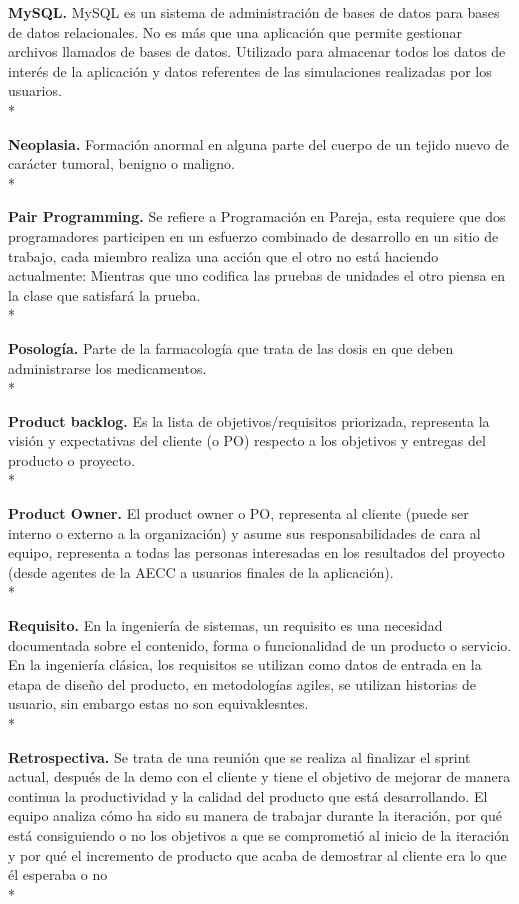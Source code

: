 \documentclass[../pfc.tex]{subfiles}
\begin{document}
	\textbf{MySQL.}
	MySQL es un sistema de administración de bases de datos para bases de datos relacionales. No es más que una aplicación que permite gestionar archivos llamados de bases de datos. Utilizado para almacenar todos los datos de interés de la aplicación y datos referentes de las simulaciones realizadas por los usuarios.\\*
	
	\textbf{Neoplasia.}
	Formación anormal en alguna parte del cuerpo de un tejido nuevo de carácter tumoral, benigno o maligno.\\*
	
	\textbf{Pair Programming.}
	Se refiere a Programación en Pareja, esta requiere que dos programadores participen en un esfuerzo combinado de desarrollo en un sitio de trabajo, cada miembro realiza una acción que el otro no está haciendo actualmente: Mientras que uno codifica las pruebas de unidades el otro piensa en la clase que satisfará la prueba.\\*
	
	\textbf{Posología.}
	Parte de la farmacología que trata de las dosis en que deben administrarse los medicamentos.\\*
	
	\textbf{Product backlog.}
	Es la lista de objetivos/requisitos priorizada, representa la visión y expectativas del cliente (o PO) respecto a los objetivos y entregas del producto o proyecto. \\*
	
	\textbf{Product Owner.}
	El product owner o PO, representa al cliente (puede ser interno o externo a la organización) y asume sus responsabilidades de cara al equipo, representa a todas las personas interesadas en los resultados del proyecto (desde agentes de la AECC a usuarios finales de la aplicación).\\*

	\textbf{Requisito.}
	En la ingeniería de sistemas, un requisito es una necesidad documentada sobre el contenido, forma o funcionalidad de un producto o servicio. En la ingeniería clásica, los requisitos se utilizan como datos de entrada en la etapa de diseño del producto, en metodologías agiles, se utilizan historias de usuario, sin embargo estas no son equivaklesntes.\\*
	
	\textbf{Retrospectiva.}
	Se trata de una reunión que se realiza al finalizar el sprint actual, después de la demo con el cliente y tiene el objetivo de mejorar de manera continua la productividad y la calidad del producto que está desarrollando.
	El equipo analiza cómo ha sido su manera de trabajar durante la iteración, por qué está consiguiendo o no los objetivos a que se comprometió al inicio de la iteración y por qué el incremento de producto que acaba de demostrar al cliente era lo que él esperaba o no\\*	
	
\end{document}
